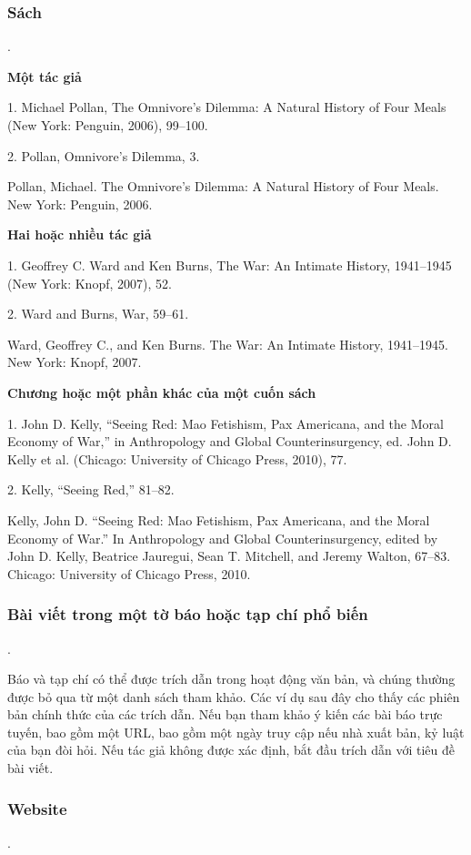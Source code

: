 \documentclass{hcmutarticle}
\begin{document}
\subsubsection{Sách}.

{\bfseries Một tác giả }

1. Michael Pollan, The Omnivore’s Dilemma: A Natural History of Four Meals (New York: Penguin, 2006), 99–100.

2. Pollan, Omnivore’s Dilemma, 3.

Pollan, Michael. The Omnivore’s Dilemma: A Natural History of Four Meals. New York: Penguin, 2006.

{\bfseries Hai hoặc nhiều tác giả}

1. Geoffrey C. Ward and Ken Burns, The War: An Intimate History, 1941–1945 (New York: Knopf, 2007), 52.

2. Ward and Burns, War, 59–61.

Ward, Geoffrey C., and Ken Burns. The War: An Intimate History, 1941–1945. New York: Knopf, 2007.

{\bfseries Chương hoặc một phần khác của một cuốn sách}

1. John D. Kelly, “Seeing Red: Mao Fetishism, Pax Americana, and the Moral Economy of War,” in Anthropology and Global Counterinsurgency, ed. John D. Kelly et al. (Chicago: University of Chicago Press, 2010), 77.

2. Kelly, “Seeing Red,” 81–82.

Kelly, John D. “Seeing Red: Mao Fetishism, Pax Americana, and the Moral Economy of War.” In Anthropology and Global Counterinsurgency, edited by John D. Kelly, Beatrice Jauregui, Sean T. Mitchell, and Jeremy Walton, 67–83. Chicago: University of Chicago Press, 2010. 

\subsubsection{Bài viết trong một tờ báo hoặc tạp chí phổ biến}.

Báo và tạp chí có thể được trích dẫn trong hoạt động văn bản, và chúng thường được bỏ qua từ một danh sách tham khảo. Các ví dụ sau đây cho thấy các phiên bản chính thức của các trích dẫn. Nếu bạn tham khảo ý kiến các bài báo trực tuyến, bao gồm một URL, bao gồm một ngày truy cập nếu nhà xuất bản, kỷ luật của bạn đòi hỏi. Nếu tác giả không được xác định, bắt đầu trích dẫn với tiêu đề bài viết.

\subsubsection{Website}.
\end{document}
